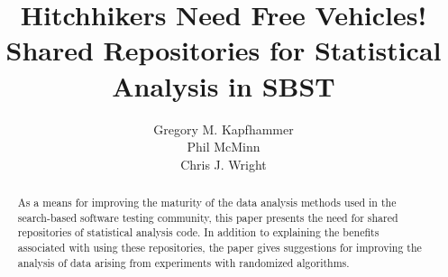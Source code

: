 \documentclass{sig-alternate}
\begin{document}


\title{Hitchhikers Need Free Vehicles! \\ Shared Repositories for Statistical Analysis in SBST \vspace*{-.05in}}


\author{
\alignauthor
Gregory M. Kapfhammer\\
\alignauthor
Phil McMinn\\
\alignauthor
Chris J. Wright\\
}

\maketitle

\begin{abstract}
  As a means for improving the maturity of the data analysis methods used in the search-based software testing
  community, this paper presents the need for shared repositories of statistical analysis code. In addition to
  explaining the benefits associated with using these repositories, the paper gives suggestions for improving the
  analysis of data arising from experiments with randomized algorithms. \vspace*{-1em}
\end{abstract}






\vspace*{-.5em}

\scriptsize


\end{document}
